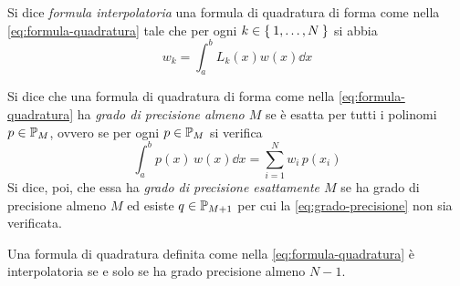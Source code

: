 	\begin{definizione}\label{def:formula-interp}
		Si dice \emph{formula interpolatoria} una formula di quadratura di forma come nella \eqref{eq:formula-quadratura} tale che per ogni \(k \in \Set{1, \dots, N}\) si abbia
		\begin{equation}\label{eq:nodo-formula-interp}
			w_k = \int_a^b L_k (x) w (x) \dd{x}
		\end{equation}
	\end{definizione}

	\begin{definizione}\label{def:grado-precisione}
		Si dice che una formula di quadratura di forma come nella \eqref{eq:formula-quadratura} ha \emph{grado di precisione almeno \(M\)} se è esatta per tutti i polinomi \(p \in \P_M\), ovvero se per ogni \(p \in \P_M\) si verifica
		\begin{equation}\label{eq:grado-precisione}
			\int_a^b p (x) \, w (x) \dd{x} = \sum_{i = 1}^N w_i \, p (x_i)
		\end{equation}
		Si dice, poi, che essa ha \emph{grado di precisione esattamente \(M\)} se ha grado di precisione almeno \(M\) ed esiste \(q \in \P_{M + 1}\) per cui la \eqref{eq:grado-precisione} non sia verificata.
	\end{definizione}

	\begin{teorema}\label{th:interp-grado-precisione}
		Una formula di quadratura definita come nella \eqref{eq:formula-quadratura} è interpolatoria se e solo se ha grado precisione almeno \(N - 1\).
	\end{teorema}

